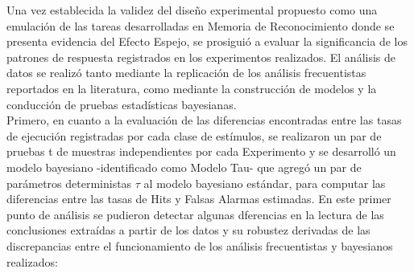 Una vez establecida la validez del diseño experimental propuesto como una emulación de las tareas desarrolladas en Memoria de Reconocimiento donde se presenta evidencia del Efecto Espejo, se prosiguió a evaluar la significancia de los patrones de respuesta registrados en los experimentos realizados. El análisis de datos se realizó tanto mediante la replicación de los análisis frecuentistas reportados en la literatura, como mediante la construcción de modelos y la conducción de pruebas estadísticas bayesianas.\\

Primero, en cuanto a la evaluación de las diferencias encontradas entre las tasas de ejecución registradas por cada clase de estímulos, se realizaron un par de pruebas t de muestras independientes por cada Experimento y se desarrolló un modelo bayesiano -identificado como Modelo Tau- que agregó un par de parámetros deterministas $\tau$ al modelo bayesiano estándar, para computar las diferencias entre las tasas de Hits y Falsas Alarmas estimadas. En este primer punto de análisis se pudieron detectar algunas dferencias en la lectura de las conclusiones extraídas a partir de los datos y su robustez derivadas de las discrepancias entre el funcionamiento de los análisis frecuentistas y bayesianos realizados:\\

